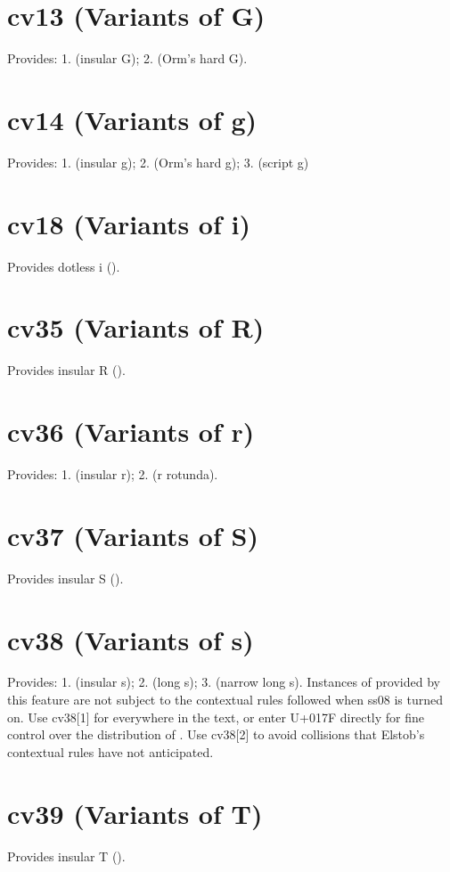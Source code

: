 \documentclass[12pt,letterpaper,openany]{book}
\begin{document}
\section{cv13 (Variants of G)}
Provides: 1.  (insular G); 2.  (Orm’s hard G).

\section{cv14 (Variants of g)}
Provides: 1.  (insular g); 2.  (Orm’s hard g);
3.  (script g)

\section{cv18 (Variants of i)}
Provides dotless i ().

\section{cv35 (Variants of R)}
Provides insular R ().

\section{cv36 (Variants of r)}
Provides: 1.  (insular r); 2.  (r rotunda).

\section{cv37 (Variants of S)}
Provides insular S ().

\section{cv38 (Variants of s)}
Provides: 1.  (insular s); 2.  (long s);
3.  (narrow long s). Instances of \textbf{}
provided by this feature are not subject to the contextual rules followed
when ss08 is turned on. Use cv38[1] for \textbf{}
everywhere in the text, or enter U+017F directly for fine control over the
distribution of \textbf{}. Use cv38[2] to avoid collisions that
Elstob’s contextual rules have not anticipated.

\section{cv39 (Variants of T)}
Provides insular T ().
\end{document}
